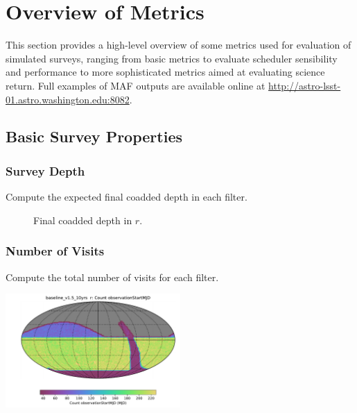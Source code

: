 \section{Overview of Metrics}

This section provides a high-level overview of some metrics used for evaluation of simulated surveys, ranging from basic metrics to evaluate scheduler sensibility and performance to more sophisticated metrics aimed at evaluating science return.
Full examples of MAF outputs are available online at \url{http://astro-lsst-01.astro.washington.edu:8082}.  

{\centering

\subsection{Basic Survey Properties}

\subsubsection{Survey Depth}

Compute the expected final coadded depth in each filter. 
\begin{figure}
\caption{Final coadded depth in $r$. } \label{fig:metric-depth}
\end{figure}

\subsubsection{Number of Visits}

Compute the total number of visits for each filter.

\includegraphics[width=0.5\textwidth]{metric_summary/baseline_v1.5_10yrs/baseline_v1_5_10yrs_Count_observationStartMJD_r_HEAL_SkyMap.pdf}

}

